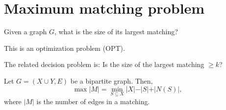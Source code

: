 \section{Maximum matching problem}
\begin{question}
    Given a graph \(G\), what is the size of its largest matching? 
\end{question}

This is an optimization problem (OPT). 

The related decision problem is: Is the size of the largest matching \(\ge k\)?

\begin{theorem}
    Let \(G = (X \cup Y, E)\) be a bipartite graph. Then, 
    \[
        \max \vert M \vert = \min _{S \subseteq X} \vert X \vert - \vert S \vert + \vert N(S) \vert,
    \] 
    where \(\vert M \vert \) is the number of edges in a matching. 
\end{theorem}

